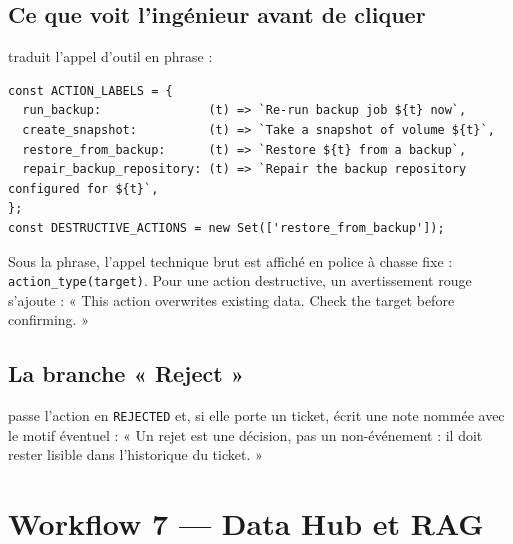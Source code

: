 \clearpage

\subsection*{Ce que voit l'ingénieur avant de cliquer}
 traduit l'appel d'outil en phrase :

\begin{lstlisting}[caption={frontend/src/components/ActionProposal.tsx}]
const ACTION_LABELS = {
  run_backup:               (t) => `Re-run backup job ${t} now`,
  create_snapshot:          (t) => `Take a snapshot of volume ${t}`,
  restore_from_backup:      (t) => `Restore ${t} from a backup`,
  repair_backup_repository: (t) => `Repair the backup repository configured for ${t}`,
};
const DESTRUCTIVE_ACTIONS = new Set(['restore_from_backup']);
\end{lstlisting}

\noindent
Sous la phrase, l'appel technique brut est affiché en police à chasse fixe :
\texttt{action\_type(target)}. Pour une action destructive, un avertissement
rouge s'ajoute : « This action overwrites existing data. Check the target before
confirming. »

\subsection*{La branche « Reject »}
 passe l'action en \texttt{REJECTED}
et, si elle porte un ticket, écrit une note nommée avec le motif éventuel :
« Un rejet est une décision, pas un non-événement : il doit rester lisible dans
l'historique du ticket. »

\section{Workflow 7 --- Data Hub et RAG}

